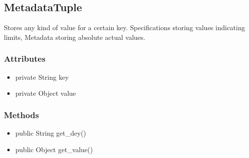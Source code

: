 \subsection{MetadataTuple}
Stores any kind of value for a certain key. Specifications storing values indicating limits, Metadata storing absolute actual values.

\subsubsection{Attributes}
\begin{itemize}
	\item private String key
	\item private Object value
\end{itemize}
\subsubsection{Methods}
\begin{itemize}
	\item public String get_dey()
	\item public Object get_value()
\end{itemize}
